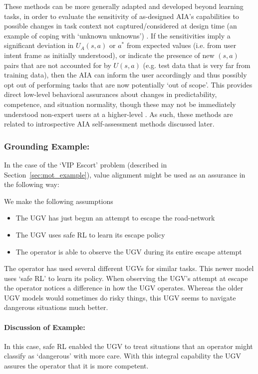 These methods can be more generally adapted and developed beyond learning tasks, in order to evaluate the sensitivity of as-designed AIA's capabilities to possible changes in task context not captured/considered at design time (an example of coping with `unknown unknowns') . 
If the sensitivities imply a significant deviation in $U_A(s,a)$ or $a^*$ from expected values (i.e. from user intent frame as initially understood), or indicate the presence of new $(s,a)$ pairs that are not accounted for by $U(s,a)$ (e.g. test data that is very far from training data), then the AIA can inform the user accordingly and thus possibly opt out of performing tasks that are now potentially `out of scope'. This provides direct low-level behavioral assurances about changes in predictability, competence, and situation normality, though these may not be immediately understood non-expert users at a higher-level . As such, these methods are related to introspective AIA self-assessment methods discussed later. 


\subsubsection{Grounding Example:}
In the case of the `VIP Escort' problem (described in Section~\ref{sec:mot_example}), value alignment might be used as an assurance in the following way:

We make the following assumptions

\begin{itemize}
    \item The UGV has just begun an attempt to escape the road-network
    \item The UGV uses safe RL to learn its escape policy
    \item The operator is able to observe the UGV during its entire escape attempt
\end{itemize}

The operator has used several different UGVs for similar tasks. This newer model uses `safe RL' to learn its policy. When observing the UGV's attempt at escape the operator notices a difference in how the UGV operates. Whereas the older UGV models would sometimes do risky things, this UGV seems to navigate dangerous situations much better. 

\paragraph{\textbf{Discussion of Example:}} In this case, safe RL enabled the UGV to treat situations that an operator might classify as `dangerous' with more care. With this integral capability the UGV assures the operator that it is more competent.
